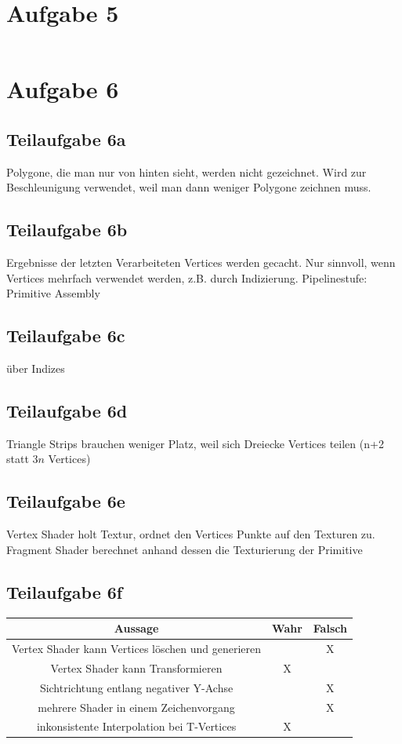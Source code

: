 \documentclass[a4paper]{scrartcl}
\begin{document}
\clearpage
\section*{Aufgabe 5}
\inputminted[linenos, numbersep=5pt, tabsize=4, frame=lines, label=shader5.frag]{glsl}{shader5.frag}

\section*{Aufgabe 6}
\subsection*{Teilaufgabe 6a}
Polygone, die man nur von hinten sieht, werden nicht gezeichnet. Wird zur
Beschleunigung verwendet, weil man dann weniger Polygone zeichnen muss.

\subsection*{Teilaufgabe 6b}
Ergebnisse der letzten Verarbeiteten Vertices werden gecacht. Nur sinnvoll,
wenn Vertices mehrfach verwendet werden, z.B. durch Indizierung. Pipelinestufe:
Primitive Assembly

\subsection*{Teilaufgabe 6c}
über Indizes

\subsection*{Teilaufgabe 6d}
Triangle Strips brauchen weniger Platz, weil sich Dreiecke Vertices teilen (n+2
statt $3n$ Vertices)

\subsection*{Teilaufgabe 6e}
Vertex Shader holt Textur, ordnet den Vertices Punkte auf den Texturen zu.
Fragment Shader berechnet anhand dessen die Texturierung der Primitive

\subsection*{Teilaufgabe 6f}
\begin{tabular}{|c|c|c|}\hline
    Aussage & Wahr & Falsch \\\hline
    \hline
    Vertex Shader kann Vertices löschen und generieren & & X \\
    \hline
    Vertex Shader kann Transformieren & X & \\
    \hline
    Sichtrichtung entlang negativer Y-Achse & & X \\
    \hline
    mehrere Shader in einem Zeichenvorgang & & X \\
    \hline
    inkonsistente Interpolation bei T-Vertices & X & \\
    \hline
\end{tabular}
\end{document}
